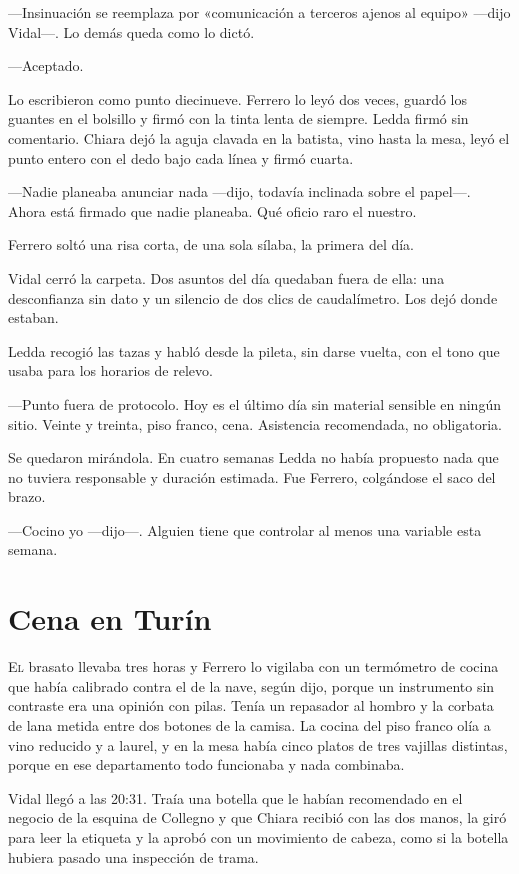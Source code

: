 ---Insinuación se reemplaza por «comunicación a terceros ajenos al equipo» ---dijo Vidal---. Lo demás queda como lo dictó.

---Aceptado.

Lo escribieron como punto diecinueve. Ferrero lo leyó dos veces, guardó los guantes en el bolsillo y firmó con la tinta lenta de siempre. Ledda firmó sin comentario. Chiara dejó la aguja clavada en la batista, vino hasta la mesa, leyó el punto entero con el dedo bajo cada línea y firmó cuarta.

---Nadie planeaba anunciar nada ---dijo, todavía inclinada sobre el papel---. Ahora está firmado que nadie planeaba. Qué oficio raro el nuestro.

Ferrero soltó una risa corta, de una sola sílaba, la primera del día.

Vidal cerró la carpeta. Dos asuntos del día quedaban fuera de ella: una desconfianza sin dato y un silencio de dos clics de caudalímetro. Los dejó donde estaban.

Ledda recogió las tazas y habló desde la pileta, sin darse vuelta, con el tono que usaba para los horarios de relevo.

---Punto fuera de protocolo. Hoy es el último día sin material sensible en ningún sitio. Veinte y treinta, piso franco, cena. Asistencia recomendada, no obligatoria.

Se quedaron mirándola. En cuatro semanas Ledda no había propuesto nada que no tuviera responsable y duración estimada. Fue Ferrero, colgándose el saco del brazo.

---Cocino yo ---dijo---. Alguien tiene que controlar al menos una variable esta semana.

\clearpage

\chapter{Cena en Turín}

\lettrine[lines=2, lhang=0.1, nindent=0.2em]{E}{l} brasato llevaba tres horas y Ferrero lo vigilaba con un termómetro de cocina que había calibrado contra el de la nave, según dijo, porque un instrumento sin contraste era una opinión con pilas. Tenía un repasador al hombro y la corbata de lana metida entre dos botones de la camisa. La cocina del piso franco olía a vino reducido y a laurel, y en la mesa había cinco platos de tres vajillas distintas, porque en ese departamento todo funcionaba y nada combinaba.


Vidal llegó a las 20:31. Traía una botella que le habían recomendado en el negocio de la esquina de Collegno y que Chiara recibió con las dos manos, la giró para leer la etiqueta y la aprobó con un movimiento de cabeza, como si la botella hubiera pasado una inspección de trama.

